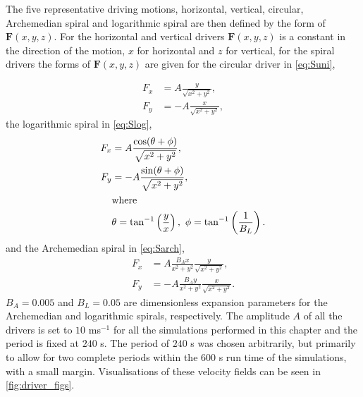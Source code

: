 \documentclass[a4paper,12pt,fourier,authoryear,custommargin]{Classes/PhDThesisPSnPDF}
\renewcommand{\vec}{\mathbf}
\begin{document}
The five representative driving motions, horizontal, vertical, circular, Archemedian spiral and logarithmic spiral are then defined by the form of $\vec{F}(x,y,z)$. For the horizontal and vertical drivers $\vec{F}(x,y,z)$ is a constant in the direction of the motion, $x$ for horizontal and $z$ for vertical, for the spiral drivers the forms of $\vec{F}(x,y,z)$ are given for the circular driver in \cref{eq:Suni},

\begin{subequations}
    \begin{align}
        F_x &= A \frac{y}{\sqrt{x^2 + y^2}},\\
        F_y &= - A \frac{x}{\sqrt{x^2 + y^2}},
    \end{align}
    \label{eq:Suni}
\end{subequations}
the logarithmic spiral in \cref{eq:Slog},
\begin{subequations}
    \begin{align}
        F_x &= A \frac{\cos(\theta + \phi)}{\sqrt{x^2 + y^2}},\\
        F_y &= - A \frac{\sin(\theta + \phi)}{\sqrt{x^2 + y^2}},\\
            &\text{where}\notag\\
            &\theta = \tan^{-1}\left(\frac{y}{x}\right),\ \phi = \tan^{-1}\left(\frac{1}{B_L}\right).\notag
    \end{align}
    \label{eq:Slog}
\end{subequations}
and the Archemedian spiral in \cref{eq:Sarch},
\begin{subequations}
    \begin{align}
        F_x &= A \frac{B_Ax}{x^2 + y^2} \frac{y}{\sqrt{x^2 + y^2}},\\
        F_y &= - A \frac{B_Ay}{x^2 + y^2} \frac{x}{\sqrt{x^2 + y^2}}.
    \end{align}
    \label{eq:Sarch}
\end{subequations}
$B_A = 0.005$ and $B_L = 0.05$ are dimensionless expansion parameters for the Archemedian  and logarithmic spirals, respectively.
The amplitude $A$ of all the drivers is set to $10$ ms$^{-1}$ for all the simulations performed in this chapter and the period is fixed at $240$ s.
The period of $240$ s was chosen arbitrarily, but primarily to allow for two complete periods within the $600$ s run time of the simulations, with a small margin.
Visualisations of these velocity fields can be seen in \cref{fig:driver_figs}.
\end{document}
